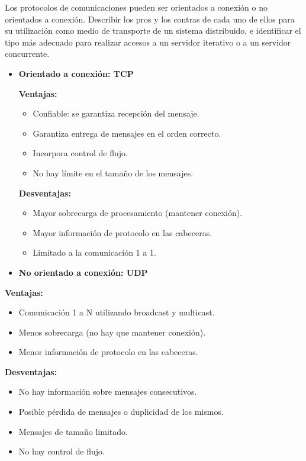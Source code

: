   \begin{problem}[17]
  Los protocolos de comunicaciones pueden ser orientados a conexión o no
  orientados a conexión. Describir los pros y los contras de cada uno de
  ellos para su utilización como medio de transporte de un sistema distribuido,
  e identificar el tipo más adecuado para realizar accesos a un servidor
  iterativo o a un servidor concurrente.
  \solution
\begin{itemize}
\item \textbf{Orientado a conexión: TCP}

 \subitem \textbf{Ventajas:}
 \begin{itemize}
\item Confiable: se garantiza recepción del mensaje.
\item Garantiza entrega de mensajes en el orden correcto.
\item Incorpora control de flujo.
\item No hay límite en el tamaño de los mensajes.
\end{itemize}
\subitem \textbf{Desventajas:}
\begin{itemize}
\item Mayor sobrecarga de procesamiento (mantener conexión).
\item Mayor información de protocolo en las cabeceras.
\item Limitado a la comunicación 1 a 1.
\end{itemize}

\item \textbf{No orientado a conexión: UDP}
\end{itemize}
 \subitem \textbf{Ventajas:}
 \begin{itemize}
\item Comunicación 1 a N utilizando broadcast y multicast.
\item Menos sobrecarga (no hay que mantener conexión).
\item Menor información de protocolo en las cabeceras.
\end{itemize}
\subitem \textbf{Desventajas:}
\begin{itemize}
\item No hay información sobre mensajes consecutivos.
\item Posible pérdida de mensajes o duplicidad de los mismos.
\item Mensajes de tamaño limitado.
\item No hay control de flujo.
\end{itemize}


\end{problem}
